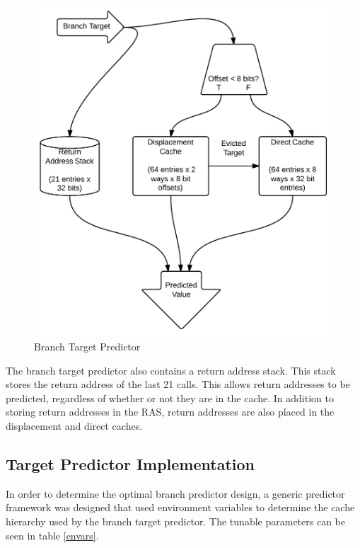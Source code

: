 \documentclass[twocolumn]{article}
\newcommand{\centerimage}[3]{
\begin{figure}[ht!]  
\begin{center}
#1
\caption{#2}
\label{#3}
\end{center}
\end{figure}}
\begin{document}
\centerimage{\includegraphics[width=\columnwidth]{BTB.png}}{Branch
  Target Predictor}{btbshape}

The branch target predictor also contains a return address stack. This
stack stores the return address of the last 21 calls. This allows
return addresses to be predicted, regardless of whether or not they
are in the cache. In addition to storing return addresses in the RAS,
return addresses are also placed in the displacement and direct
caches.

\subsection{Target Predictor Implementation}

In order to determine the optimal branch predictor design, a generic
predictor framework was designed that used environment variables to
determine the cache hierarchy used by the branch target predictor.
The tunable parameters can be seen in table \ref{envars}. 
\end{document}
